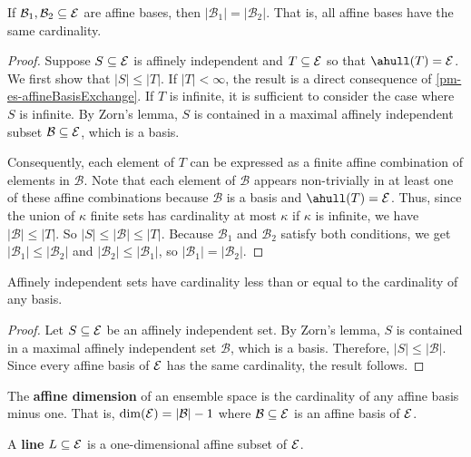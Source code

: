 \begin{mathSection}
\begin{prop}
	If $\mathcal{B}_1, \mathcal{B}_2 \subseteq \mathcal{E}$ are affine bases, then $|\mathcal{B}_1| = |\mathcal{B}_2|$. That is, all affine bases have the same cardinality.
\end{prop}

\begin{proof}
	Suppose $S \subseteq \mathcal{E}$ is affinely independent and $T \subseteq \mathcal{E}$ so that $\ahull(T) = \Ens$. We first show that $|S| \le |T|$. If $|T| < \infty$, the result is a direct consequence of \ref{pm-es-affineBasisExchange}. If $T$ is infinite, it is sufficient to consider the case where $S$ is infinite. By Zorn's lemma, $S$ is contained in a maximal affinely independent subset $\mathcal{B} \subseteq \mathcal{E}$, which is a basis.
	
	Consequently, each element of $T$ can be expressed as a finite affine combination of elements in $\mathcal{B}$. Note that each element of $\mathcal{B}$ appears non-trivially in at least one of these affine combinations because $\mathcal{B}$ is a basis and $\ahull(T) = \Ens$. Thus, since the union of $\kappa$ finite sets has cardinality at most $\kappa$ if $\kappa$ is infinite, we have $|\mathcal{B}| \le |T|$. So $|S| \le |\mathcal{B}| \le |T|$. Because $\mathcal{B}_1$ and $\mathcal{B}_2$ satisfy both conditions, we get $|\mathcal{B}_1| \le |\mathcal{B}_2|$ and $|\mathcal{B}_2| \le |\mathcal{B}_1|$, so $|\mathcal{B}_1| = |\mathcal{B}_2|$.
\end{proof}

\begin{coro}
	Affinely independent sets have cardinality less than or equal to the cardinality of any basis.
\end{coro}

\begin{proof}
	Let $S \subseteq \mathcal{E}$ be an affinely independent set. By Zorn's lemma, $S$ is contained in a maximal affinely independent set $\mathcal{B}$, which is a basis. Therefore, $|S| \le |\mathcal{B}|$. Since every affine basis of $\mathcal{E}$ has the same cardinality, the result follows.
\end{proof}

\begin{defn}
	The \textbf{affine dimension} of an ensemble space is the cardinality of any affine basis minus one. That is, $\dim(\mathcal{E}) = |\mathcal{B}|-1$ where $\mathcal{B} \subseteq \mathcal{E}$ is an affine basis of $\mathcal{E}$.
\end{defn}

\begin{defn}
	A \textbf{line} $L \subseteq \mathcal{E}$ is a one-dimensional affine subset of $\mathcal{E}$.
\end{defn}


\end{mathSection}
